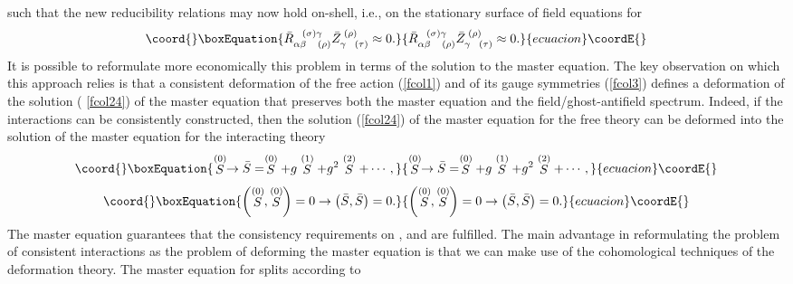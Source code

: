 \documentclass[a4paper,12pt]{article}
\begin{document}
such that the new reducibility relations may now hold on-shell, i.e., on the
stationary surface of field equations for \coordHE{}%
\begin{equation}\coord{}\boxEquation{
\bar{R}_{\alpha \beta \;\;\;\;(\rho )}^{\;\;\;(\sigma )\gamma }\bar{Z}
_{\gamma \;\;\;(\tau )}^{\;(\rho )}\approx 0.  \label{fcol29}
}{
\bar{R}_{\alpha \beta \;\;\;\;(\rho )}^{\;\;\;(\sigma )\gamma }\bar{Z}
_{\gamma \;\;\;(\tau )}^{\;(\rho )}\approx 0.  }{ecuacion}\coordE{}\end{equation}
It is possible to reformulate more economically this problem in terms of the
solution to the master equation. The key observation on which this approach
relies is that a consistent deformation of the free action (\ref{fcol1}) and
of its gauge symmetries (\ref{fcol3}) defines a deformation of the solution (%
\ref{fcol24}) of the master equation that preserves both the master equation
and the field/ghost-antifield spectrum. Indeed, if the interactions can be
consistently constructed, then the solution (\ref{fcol24}) of the master
equation for the free theory can be deformed into the solution \coordHE{} of
the master equation for the interacting theory 
\begin{equation}\coord{}\boxEquation{
\stackrel{(0)}{S}\rightarrow \bar{S}=\stackrel{(0)}{S}+g\stackrel{(1)}{S}
+g^{2}\stackrel{(2)}{S}+\cdots ,  \label{fcol25}
}{
\stackrel{(0)}{S}\rightarrow \bar{S}=\stackrel{(0)}{S}+g\stackrel{(1)}{S}
+g^{2}\stackrel{(2)}{S}+\cdots ,  }{ecuacion}\coordE{}\end{equation}
\begin{equation}\coord{}\boxEquation{
\left( \stackrel{(0)}{S},\stackrel{(0)}{S}\right) =0\rightarrow \left( \bar{S
},\bar{S}\right) =0.  \label{fcol7}
}{
\left( \stackrel{(0)}{S},\stackrel{(0)}{S}\right) =0\rightarrow \left( \bar{S
},\bar{S}\right) =0.  }{ecuacion}\coordE{}\end{equation}
The master equation \coordHE{} guarantees that the
consistency requirements on \coordHE{}, \coordHE{} and \coordHE{} are fulfilled. The main advantage in reformulating the
problem of consistent interactions as the problem of deforming the master
equation is that we can make use of the cohomological techniques of the
deformation theory. The master equation for \coordHE{} splits according to
\end{document}
